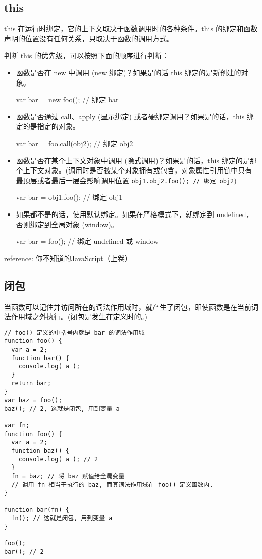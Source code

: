 \subsection{this}\hypertarget{this}{}\label{this}

this 在运行时绑定，它的上下文取决于函数调用时的各种条件。this 的绑定和函数声明的位置没有任何关系，只取决于函数的调用方式。

判断 this 的优先级，可以按照下面的顺序进行判断：

\begin{itemize}
\item 函数是否在 new 中调用 (new 绑定)？如果是的话 this 绑定的是新创建的对象。

var bar = new foo(); // 绑定 bar
\item 函数是否通过 call、apply (显示绑定) 或者硬绑定调用？如果是的话，this 绑定的是指定的对象。

var bar = foo.call(obj2); // 绑定 obj2
\item 函数是否在某个上下文对象中调用 (隐式调用)？如果是的话，this 绑定的是那个上下文对象。(调用时是否被某个对象拥有或包含，对象属性引用链中只有最顶层或者最后一层会影响调用位置 \texttt{obj1.obj2.foo(); // 绑定 obj2})

var bar = obj1.foo(); // 绑定 obj1
\item 如果都不是的话，使用默认绑定。如果在严格模式下，就绑定到 undefined，否则绑定到全局对象 (window)。

var bar = foo(); // 绑定 undefined 或 window
\end{itemize}

reference: \href{http://book.douban.com/subject/26351021/}{你不知道的JavaScript（上卷）}

\subsection{闭包}\hypertarget{section-5}{}\label{section-5}

当函数可以记住并访问所在的词法作用域时，就产生了闭包，即使函数是在当前词法作用域之外执行。(闭包是发生在定义时的。)

\begin{verbatim}// foo() 定义的中括号内就是 bar 的词法作用域
function foo() {
  var a = 2;
  function bar() {
    console.log( a );
  }
  return bar;
}
var baz = foo();
baz(); // 2, 这就是闭包, 用到变量 a

var fn;
function foo() {
  var a = 2;
  function baz() {
    console.log( a ); // 2
  }
  fn = baz; // 将 baz 赋值给全局变量
  // 调用 fn 相当于执行的 baz, 而其词法作用域在 foo() 定义函数内.
}

function bar(fn) {
  fn(); // 这就是闭包, 用到变量 a
}

foo();
bar(); // 2
\end{verbatim}

